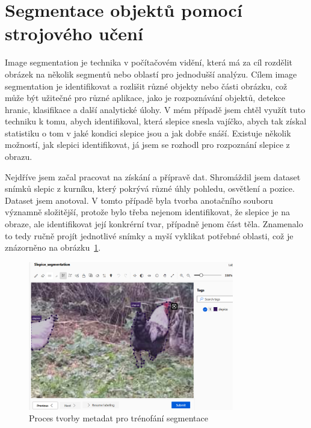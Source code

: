 \section{Segmentace objektů pomocí strojového učení}\label{sec:klasifikace-a-segmentace-objektu-pomoci-strojoveho-uceni}

Image segmentation je technika v počítačovém vidění, která má za cíl rozdělit obrázek na několik segmentů nebo oblastí pro jednodušší analýzu.
Cílem image segmentation je identifikovat a rozlišit různé objekty nebo části obrázku, což může být užitečné pro různé aplikace, jako je rozpoznávání objektů, detekce hranic, klasifikace a další analytické úlohy.
V mém případě jsem chtěl využít tuto techniku k tomu, abych identifikoval, která slepice snesla vajíčko, abych tak získal statistiku o tom v jaké kondici slepice jsou a jak dobře snáší.
Existuje několik možností, jak slepici identifikovat, já jsem se rozhodl pro rozpoznání slepice z obrazu.

Nejdříve jsem začal pracovat na získání a přípravě dat.
Shromáždil jsem dataset snímků slepic z kurníku, který pokrývá různé úhly pohledu, osvětlení a pozice.
Dataset jsem anotoval.
V tomto případě byla tvorba anotačního souboru významně složitější, protože bylo třeba nejenom identifikovat, že slepice je na obraze, ale identifikovat její konkrérní tvar, případně jenom část těla.
Znamenalo to tedy ručně projít jednotlivé snímky a myší vyklikat potřebné oblasti, což je znázorněno na obrázku~\ref{fig:label_segmentation}.

\begin{figure}[h]
    \centering
    \includegraphics[width=0.8\textwidth]{img/label_segmentation}
    \caption{Proces tvorby metadat pro trénofání segmentace}
    \label{fig:label_segmentation}
\end{figure}

